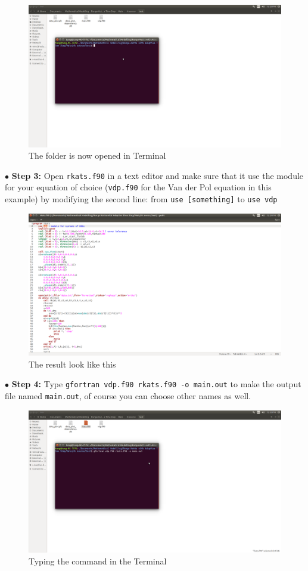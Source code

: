 \documentclass{article}
\begin{document}
	\begin{figure}[H]
		\centering	\includegraphics[width=15cm]{fig3}
		\caption{The folder is now opened in Terminal}
	\end{figure}
	\noindent$\bullet$ \textbf{Step 3:} Open \texttt{rkats.f90} in a text editor and make sure that it use the module for your equation of choice (\texttt{vdp.f90} for the Van der Pol equation in this example) by modifying the second line: from \texttt{use [something]} to \texttt{use vdp}
	\begin{figure}[H]
		\centering	\includegraphics[width=15cm]{fig4}
		\caption{The result look like this}
	\end{figure}
	\noindent$\bullet$ \textbf{Step 4:} Type \texttt{gfortran vdp.f90 rkats.f90 -o main.out} to make the output file named \texttt{main.out}, of course you can choose other names as well.
	\begin{figure}[H]
		\centering	\includegraphics[width=15cm]{fig5}
		\caption{Typing the command in the Terminal}
	\end{figure}
\end{document}
